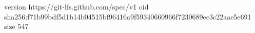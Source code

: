 version https://git-lfs.github.com/spec/v1
oid sha256:f71b99bdf5d1b14b04515bf96416a9f59340660966f7230689ec3c22aae5e691
size 547
